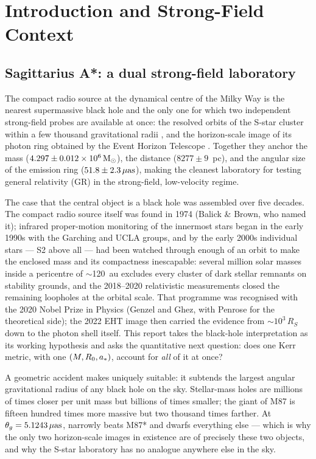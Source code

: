 \chapter{Introduction and Strong-Field Context}
\label{ch:intro}

\section{Sagittarius A*: a dual strong-field laboratory}
\label{sec:duallab}

The compact radio source \sgra{} at the dynamical centre of the Milky Way is
the nearest supermassive black hole and the only one for which two
independent strong-field probes are available at once: the resolved orbits
of the S-star cluster within a few thousand gravitational radii
\citep{Gillessen2017,Gravity2018,Gravity2020,Gravity2022}, and the
horizon-scale image of its photon ring obtained by the Event Horizon
Telescope \citep{EHT2022}. Together they anchor the mass
($4.297\pm0.012\times10^{6}\,\mathrm{M}_\odot$), the distance ($8277\pm9$~pc), and the
angular size of the emission ring ($51.8\pm2.3\,\mu\mathrm{as}$), making \sgra{} the
cleanest laboratory for testing general relativity (GR) in the
strong-field, low-velocity regime.

The case that the central object is a black hole was assembled over
five decades. The compact radio source itself was found in 1974 (Balick
\& Brown, who named it); infrared proper-motion monitoring of the
innermost stars began in the early 1990s with the Garching and UCLA
groups, and by the early 2000s individual stars — S2 above all — had
been watched through enough of an orbit to make the enclosed mass and
its compactness inescapable: several million solar masses inside a
pericentre of $\sim$120~au excludes every cluster of dark stellar
remnants on stability grounds, and the 2018--2020 relativistic
measurements closed the remaining loopholes at the orbital scale. That
programme was recognised with the 2020 Nobel Prize in Physics (Genzel
and Ghez, with Penrose for the theoretical side); the 2022 EHT image
then carried the evidence from $\sim$$10^3\,R_S$ down to the photon
shell itself. This report takes the black-hole interpretation as its
working hypothesis and asks the quantitative next question: does one
Kerr metric, with one $(M, R_0, a_*)$, account for \emph{all} of it
at once?

A geometric accident makes \sgra{} uniquely suitable: it subtends the
largest angular gravitational radius of any black hole on the sky.
Stellar-mass holes are millions of times closer per unit mass but
billions of times smaller; the giant of M87 is fifteen hundred times
more massive but two thousand times farther. At
$\theta_g = 5.1243\,\mu\mathrm{as}$, \sgra{} narrowly beats M87* and dwarfs
everything else — which is why the only two horizon-scale images in
existence are of precisely these two objects, and why the S-star
laboratory has no analogue anywhere else in the sky.

